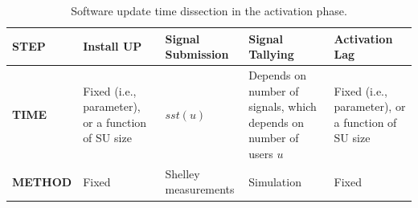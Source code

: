 \begin{table} [h!]
\centering
\begin{tabu} to 1.0\textwidth {||X[c] | X[l] | X[c] | X[l] | X[l]||}
\hline
\textbf{STEP} & Install UP & Signal Submission & Signal Tallying & Activation Lag\\
\hline
\hline
\textbf{TIME} & Fixed (i.e., parameter), or a function of SU size & $sst(u)$ & Depends on number of signals, which depends on number of users $u$  & Fixed (i.e., parameter), or a function of SU size \\
\hline
\textbf{METHOD} & Fixed & Shelley measurements & Simulation & Fixed \\
\hline
\end{tabu}
\caption{Software update time dissection in the activation phase.}
\label{activation_dis}
\end{table}
